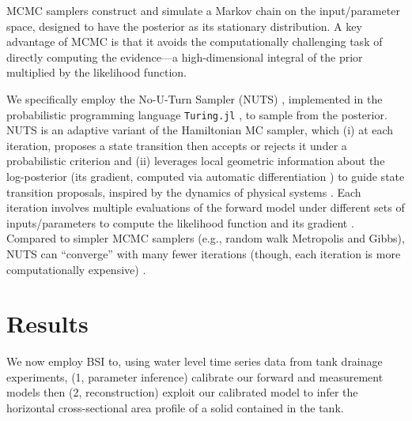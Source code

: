 \documentclass[a4paper,fleqn]{cas-dc}
\begin{document}
MCMC samplers construct and simulate a Markov chain \cite{dobrow2016introduction} on the input/parameter space, designed to have the posterior as its stationary distribution.
A key advantage of MCMC is that it avoids the computationally challenging task of directly computing the evidence---a high-dimensional integral of the prior multiplied by the likelihood function. \cite{van2021bayesian}

We specifically employ the No-U-Turn Sampler (NUTS) \cite{hoffman2014no}, implemented in the probabilistic programming language \cite{gordon2014probabilistic} \texttt{Turing.jl} \cite{ge2018turing,xu2020advancedhmc}, to sample from the posterior.
NUTS is an adaptive variant of the Hamiltonian MC \cite{betancourt2017conceptual} sampler, which (i) at each iteration, proposes a state transition then accepts or rejects it under a probabilistic criterion and (ii) leverages local geometric information about the log-posterior (its gradient, computed via automatic differentiation \cite{baydin2018automatic}) to guide state transition proposals, inspired by the dynamics of physical systems \cite{duane1987hybrid}.
Each iteration involves multiple evaluations of the forward model under different sets of inputs/parameters to compute the likelihood function and its gradient \cite{paun2022emulation,patel2024multi}. 
Compared to simpler MCMC samplers (e.g., random walk Metropolis and Gibbs), NUTS can ``converge'' \cite{roy2020convergence} with many fewer iterations
(though, each iteration is more computationally expensive)
\cite{chong2017comparison,hoffman2014no,robert2018accelerating,shi2024bayesian,turner2017well}.



\section{Results}
We now employ BSI to, using water level time series data from tank drainage experiments,  
(1, parameter inference) calibrate our forward and measurement models then
(2, reconstruction) exploit our calibrated model to infer the horizontal cross-sectional area profile of a solid contained in the tank.
\end{document}
